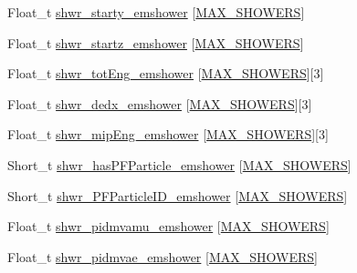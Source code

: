 \begin{DoxyCompactItemize}
\item 
Float\-\_\-t \hyperlink{classanatree_ac370306b31632d3a3790081998d86dae}{shwr\-\_\-starty\-\_\-emshower} \mbox{[}\hyperlink{anatree__core__v09410002_8h_aa8deaf72f1f7bd4b88c7d1ea07590801}{M\-A\-X\-\_\-\-S\-H\-O\-W\-E\-R\-S}\mbox{]}
\item 
Float\-\_\-t \hyperlink{classanatree_a0f1f0fe9cceeb189a3366ca4afbb6f9f}{shwr\-\_\-startz\-\_\-emshower} \mbox{[}\hyperlink{anatree__core__v09410002_8h_aa8deaf72f1f7bd4b88c7d1ea07590801}{M\-A\-X\-\_\-\-S\-H\-O\-W\-E\-R\-S}\mbox{]}
\item 
Float\-\_\-t \hyperlink{classanatree_a284ba0af819815e92479c6c97377924b}{shwr\-\_\-tot\-Eng\-\_\-emshower} \mbox{[}\hyperlink{anatree__core__v09410002_8h_aa8deaf72f1f7bd4b88c7d1ea07590801}{M\-A\-X\-\_\-\-S\-H\-O\-W\-E\-R\-S}\mbox{]}\mbox{[}3\mbox{]}
\item 
Float\-\_\-t \hyperlink{classanatree_a5a2edbdec9937f0591074ec227fdc7a3}{shwr\-\_\-dedx\-\_\-emshower} \mbox{[}\hyperlink{anatree__core__v09410002_8h_aa8deaf72f1f7bd4b88c7d1ea07590801}{M\-A\-X\-\_\-\-S\-H\-O\-W\-E\-R\-S}\mbox{]}\mbox{[}3\mbox{]}
\item 
Float\-\_\-t \hyperlink{classanatree_aef23f9da33311f1e7a1382be85a425f9}{shwr\-\_\-mip\-Eng\-\_\-emshower} \mbox{[}\hyperlink{anatree__core__v09410002_8h_aa8deaf72f1f7bd4b88c7d1ea07590801}{M\-A\-X\-\_\-\-S\-H\-O\-W\-E\-R\-S}\mbox{]}\mbox{[}3\mbox{]}
\item 
Short\-\_\-t \hyperlink{classanatree_ae847c0b22deb9dd4bb227ec90e1c4a03}{shwr\-\_\-has\-P\-F\-Particle\-\_\-emshower} \mbox{[}\hyperlink{anatree__core__v09410002_8h_aa8deaf72f1f7bd4b88c7d1ea07590801}{M\-A\-X\-\_\-\-S\-H\-O\-W\-E\-R\-S}\mbox{]}
\item 
Short\-\_\-t \hyperlink{classanatree_ad6193b7b49d7827a3f35511da315daeb}{shwr\-\_\-\-P\-F\-Particle\-I\-D\-\_\-emshower} \mbox{[}\hyperlink{anatree__core__v09410002_8h_aa8deaf72f1f7bd4b88c7d1ea07590801}{M\-A\-X\-\_\-\-S\-H\-O\-W\-E\-R\-S}\mbox{]}
\item 
Float\-\_\-t \hyperlink{classanatree_a73a0b351b3500cf71010cfc14920165f}{shwr\-\_\-pidmvamu\-\_\-emshower} \mbox{[}\hyperlink{anatree__core__v09410002_8h_aa8deaf72f1f7bd4b88c7d1ea07590801}{M\-A\-X\-\_\-\-S\-H\-O\-W\-E\-R\-S}\mbox{]}
\item 
Float\-\_\-t \hyperlink{classanatree_aded5848a28c2143f3f99af58b7c303e1}{shwr\-\_\-pidmvae\-\_\-emshower} \mbox{[}\hyperlink{anatree__core__v09410002_8h_aa8deaf72f1f7bd4b88c7d1ea07590801}{M\-A\-X\-\_\-\-S\-H\-O\-W\-E\-R\-S}\mbox{]}
\item 

\end{DoxyCompactItemize}
